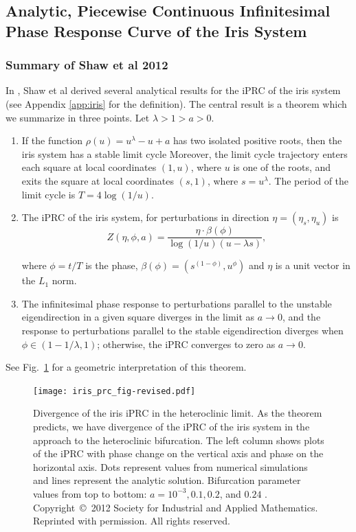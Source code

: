 \documentclass[12pt]{article}
\begin{document}
\subsection{Analytic, Piecewise Continuous Infinitesimal Phase Response Curve of the Iris System}\label{app:iris_summary}
\subsubsection{Summary of Shaw et al 2012}
In \cite{ShawParkChielThomas2012SIADS}, Shaw et al derived several analytical results for the iPRC of the iris system (see Appendix \ref{app:iris} for the definition).  The central result is a theorem which we summarize in three points.  Let $\lambda > 1 > a > 0$.
\begin{enumerate}
 \item If the function $\rho(u) = u^\lambda -u + a$ has two isolated positive roots, then the iris system has a stable limit cycle Moreover, the limit cycle trajectory enters each square at local coordinates $(1,u)$, where $u$ is one of the roots, and exits the square at local coordinates $(s,1)$, where $s = u^\lambda$.  The period of the limit cycle is $T = 4\log(1/u)$.
 \item The iPRC of the iris system, for perturbations in direction $\eta = (\eta_s,\eta_u)$ is
 \begin{equation}
  Z(\eta,\phi,a) = \frac{\eta \cdot \beta(\phi)}{\log(1/u)(u-\lambda s)},
 \end{equation}

 where $\phi = t/T$ is the phase, $\beta(\phi) = (s^{(1-\phi)}, u^\phi)$ and $\eta$ is a unit vector in the $L_1$ norm.
 \item The infinitesimal phase response to perturbations parallel to the unstable eigendirection in a given square diverges in the limit as $a \rightarrow 0$, and the response to perturbations parallel to the stable eigendirection diverges when $\phi \in (1-1/\lambda, 1)$; otherwise, the iPRC converges to zero as $a \rightarrow 0$.
\end{enumerate}
%
See Fig.~\ref{fig:iris-phase} for a geometric interpretation of this theorem.

\begin{figure}[h!]
\texttt{[image: iris\_prc\_fig-revised.pdf]}
 \caption[Divergence of the iris iPRC in the heteroclinic limit]{Divergence of the iris iPRC in the heteroclinic limit. As the theorem predicts, we have divergence of the iPRC of the iris system in the approach to the heteroclinic bifurcation.  The left column shows plots of the iPRC with phase change on the vertical axis and phase on the horizontal axis.  Dots represent values from numerical simulations and lines represent the analytic solution.  Bifurcation parameter values from top to bottom: $a=10^{-3},0.1,0.2$, and $0.24$ \cite{ShawParkChielThomas2012SIADS}.  Copyright~\copyright~2012 Society for Industrial and Applied Mathematics.  Reprinted with permission.  All rights reserved.}
\label{fig:iris-phase}\end{figure}
\end{document}
